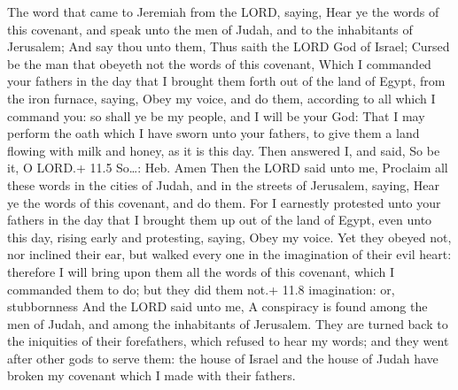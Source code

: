  The word that came to Jeremiah from the LORD, saying,
 Hear ye the words of this covenant, and speak unto the men
of Judah, and to the inhabitants of Jerusalem;  And say thou
unto them, Thus saith the LORD God of Israel; Cursed be the man that
obeyeth not the words of this covenant,  Which I commanded
your fathers in the day that I brought them forth out of the land of
Egypt, from the iron furnace, saying, Obey my voice, and do them,
according to all which I command you: so shall ye be my people, and I
will be your God:  That I may perform the oath which I have
sworn unto your fathers, to give them a land flowing with milk and
honey, as it is this day. Then answered I, and said, So be it, O LORD.+
11.5 So\ldots: Heb. Amen  Then the LORD said unto me,
Proclaim all these words in the cities of Judah, and in the streets of
Jerusalem, saying, Hear ye the words of this covenant, and do them.
 For I earnestly protested unto your fathers in the day that
I brought them up out of the land of Egypt, even unto this day, rising
early and protesting, saying, Obey my voice.  Yet they
obeyed not, nor inclined their ear, but walked every one in the
imagination of their evil heart: therefore I will bring upon them all
the words of this covenant, which I commanded them to do; but they did
them not.+ 11.8 imagination: or, stubbornness  And the LORD
said unto me, A conspiracy is found among the men of Judah, and among
the inhabitants of Jerusalem.  They are turned back to the
iniquities of their forefathers, which refused to hear my words; and
they went after other gods to serve them: the house of Israel and the
house of Judah have broken my covenant which I made with their fathers.

